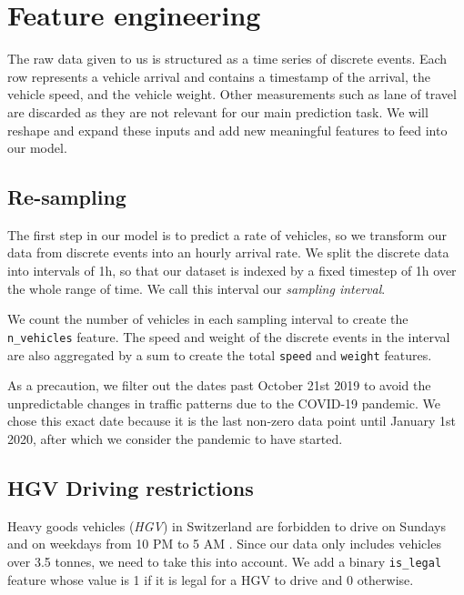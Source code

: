 \documentclass[10pt,conference,compsocconf]{IEEEtran}
\begin{document}

\section{Feature engineering}

The raw data given to us is structured as a time series of discrete events. Each row represents 
a vehicle arrival and contains a timestamp of the arrival, the vehicle speed, and the vehicle 
weight. Other measurements such as lane of travel are discarded as they are not relevant for 
our main prediction task. We will reshape and expand these inputs and add new meaningful 
features to feed into our model. 

\subsection{Re-sampling}

The first step in our model is to predict a rate of vehicles, so we transform our data from discrete
events into an hourly arrival rate. We split the discrete data into intervals of 1h, so that our dataset
is indexed by a fixed timestep of 1h over the whole range of time. We call this interval our \textit{sampling interval}. 

We count the number of vehicles in each sampling interval to create the \texttt{n\_vehicles} feature. The speed and weight of the discrete events in the interval are also aggregated by a sum to create the total \texttt{speed} and \texttt{weight} features.

As a precaution, we filter out the dates past October 21st 2019 to avoid the unpredictable changes in traffic patterns due to the COVID-19 pandemic. We chose this exact date because it is the last non-zero
data point until January 1st 2020, after which we consider the pandemic to have started.

\subsection{HGV Driving restrictions}

Heavy goods vehicles (\textit{HGV}) in Switzerland are forbidden to drive on Sundays and on weekdays from 10 PM to 5 AM \cite{road_rule} . Since our data only includes vehicles over 3.5 tonnes, we need to take this into account. We add a binary \texttt{is\_legal} feature whose value is 1 if it is legal for a HGV to drive and 0 otherwise.
\end{document}
